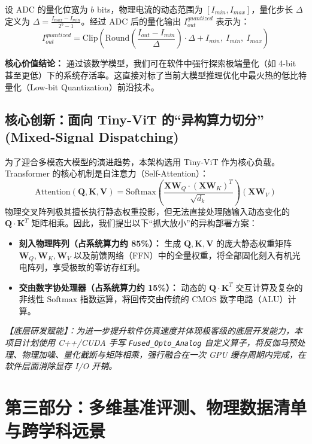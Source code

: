 \documentclass[12pt, a4paper]{ctexart}
\begin{document}
设 ADC 的量化位宽为 $b$ bits，物理电流的动态范围为 $[I_{min}, I_{max}]$，量化步长 $\Delta$ 定义为 $\Delta = \frac{I_{max} - I_{min}}{2^b - 1}$。经过 ADC 后的量化输出 $I_{out}^{quantized}$ 表示为：
\begin{equation}
    I_{out}^{quantized} = \text{Clip}\left( \text{Round}\left( \frac{I_{out} - I_{min}}{\Delta} \right) \cdot \Delta + I_{min}, \ I_{min}, \ I_{max} \right)
\end{equation}

\textbf{核心价值结论：} 通过该数学模型，我们可在软件中强行探索极端量化（如 4-bit 甚至更低）下的系统存活率。这直接对标了当前大模型推理优化中最火热的低比特量化（Low-bit Quantization）前沿技术。

\subsection{核心创新：面向 Tiny-ViT 的“异构算力切分” (Mixed-Signal Dispatching)}
为了迎合多模态大模型的演进趋势，本架构选用 Tiny-ViT 作为核心负载。Transformer 的核心机制是自注意力（Self-Attention）：
\begin{equation}
    \text{Attention}(\bm{Q}, \bm{K}, \bm{V}) = \text{Softmax}\left( \frac{\bm{X}\bm{W}_Q \cdot (\bm{X}\bm{W}_K)^T}{\sqrt{d_k}} \right) (\bm{X}\bm{W}_V)
\end{equation}
物理交叉阵列极其擅长执行静态权重投影，但无法直接处理随输入动态变化的 $\bm{Q} \cdot \bm{K}^T$ 矩阵相乘。因此，我们提出以下“抓大放小”的异构部署方案：
\begin{itemize}
    \item \textbf{刻入物理阵列（占系统算力约 85\%）：} 生成 $\bm{Q, K, V}$ 的庞大静态权重矩阵 $\bm{W}_Q, \bm{W}_K, \bm{W}_V$ 以及前馈网络（FFN）中的全量权重，将全部固化刻入有机光电阵列，享受极致的零访存红利。
    \item \textbf{交由数字协处理器（占系统算力约 15\%）：} 动态的 $\bm{Q} \cdot \bm{K}^T$ 交互计算及复杂的非线性 $\text{Softmax}$ 指数运算，将回传交由传统的 CMOS 数字电路（ALU）计算。
\end{itemize}

\textit{【底层研发赋能】：为进一步提升软件仿真速度并体现极客级的底层开发能力，本项目计划使用 C++/CUDA 手写 \texttt{Fused\_Opto\_Analog} 自定义算子，将反伽马预处理、物理加噪、量化截断与矩阵相乘，强行融合在一次 GPU 缓存周期内完成，在软件层面消除显存 I/O 开销。}

\section{第三部分：多维基准评测、物理数据清单与跨学科远景}
\end{document}

